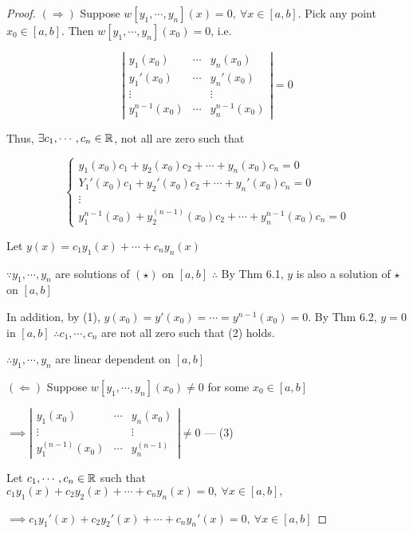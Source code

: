 \begin{proof}
	$(\Rightarrow)$ Suppose $w[y_1,\cdots,y_n](x) = 0,~\forall x \in [a,b]$. Pick any point $x_0 \in [a,b]$. Then $w[y_1,\cdots,y_n](x_0) = 0$, i.e.
	
	$$\left|\begin{matrix}
		y_1(x_0) & \cdots & y_n(x_0)\\
		y_1'(x_0) & \cdots & y_n'(x_0)\\
		\vdots & & \vdots\\
		y^{n-1}_1(x_0) & \cdots & y^{n-1}_n(x_0)
	\end{matrix}\right| = 0$$
	
	Thus, $\exists c_1,\cdots,c_n \in \mathbb{R}$, not all are zero such that
	
	$$\begin{cases}
		y_1(x_0)c_1 + y_2(x_0)c_2 + \cdots + y_n(x_0)c_n = 0\\
		Y_1'(x_0)c_1 + y_2'(x_0)c_2 + \cdots + y_n'(x_0)c_n = 0\\
		\vdots \\
		y_1^{n - 1}(x_0) + y_2^{(n-1)}(x_0)c_2 + \cdots + y_n^{n-1}(x_0)c_n = 0
	\end{cases}$$
	
	Let $y(x) = c_1y_1 (x) + \cdots + c_ny_n(x)$
	
	$\because y_1,\cdots,y_n$ are solutions of $(\star)$ on $[a,b]$ $\therefore$ By Thm 6.1, $y$ is also a solution of $\star$ on $[a,b]$
	
	In addition, by (1), $y(x_0) = y'(x_0) = \cdots = y^{n-1}(x_0) = 0$. By Thm 6.2, $y = 0$ in $[a,b]$ $\therefore c_1,\cdots,c_n$ are not all zero such that (2) holds.
	
	$\therefore y_1,\cdots,y_n$ are linear dependent on $[a,b]$
	
	$(\Leftarrow)$ Suppose $w[y_1,\cdots,y_n](x_0) \neq 0$ for some $x_0 \in [a,b]$
	
	$\implies \left| \begin{matrix}
		y_1(x_0) & \cdots & y_n(x_0) \\
		\vdots & & \vdots \\
		y^{(n-1)}_1(x_0) & \cdots & y_n^{(n-1)}
	\end{matrix}\right| \neq 0$ --- (3)
	
	Let $c_1,\cdots,c_n \in \mathbb{R}$ such that $c_1y_1(x) + c_2y_2(x) + \cdots + c_ny_n(x) = 0,~\forall x \in [a,b],$
	
	$\implies c_1y_1'(x) + c_2y_2'(x) + \cdots + c_ny_n'(x) = 0,~\forall x \in [a,b]$
	

\end{proof}
